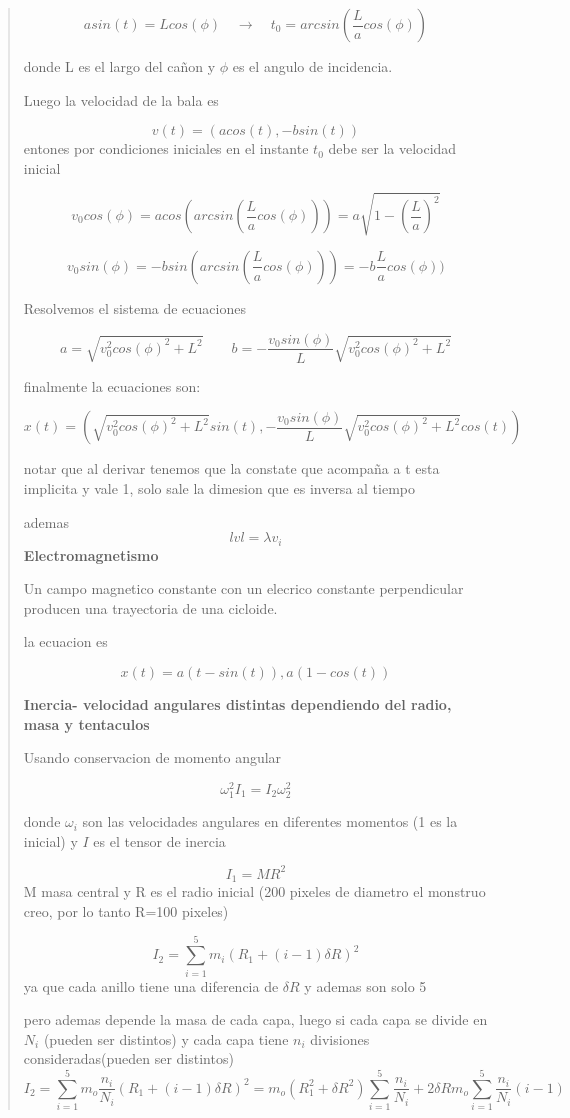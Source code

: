 \documentclass[a4paper, 10pt]{article}
\begin{document}
\begin{quote}
$$ asin(t)= Lcos(\phi) \quad \rightarrow \quad t_0= arcsin( \frac{L}{a}cos(\phi)) $$

donde L es el largo del cañon y $\phi$ es el angulo de incidencia.
 
Luego la velocidad de la bala es

$$ v(t)= (acos(t),-bsin(t)) $$
entones por condiciones iniciales en  el instante $t_0$ debe ser la velocidad inicial

$$  v_0 cos(\phi)= acos( arcsin( \frac{L}{a}cos(\phi)))= a \sqrt{1-  (\frac{L}{a})^2} $$

$$ v_0 sin(\phi) = -bsin( arcsin( \frac{L}{a}cos(\phi)))=-b \frac{L}{a}cos(\phi)) $$

Resolvemos el sistema de ecuaciones

$$ a= \sqrt{v_0^2 cos(\phi)^2 +L^2} \qquad b=- \frac{v_0 sin(\phi)}{L}\sqrt{v_0^2cos(\phi)^2 +L^2} $$

finalmente la ecuaciones son:

$$x(t)= ( \sqrt{v_0^2 cos(\phi)^2 +L^2} sin(t), - \frac{v_0 sin(\phi)}{L}\sqrt{v_0^2cos(\phi)^2 +L^2}cos(t))$$

notar que al derivar tenemos que la constate que acompaña a t esta implicita y vale 1, solo sale la dimesion que es inversa al tiempo

ademas $$ lvl = \lambda v_i $$
\textbf{Electromagnetismo}

Un campo magnetico constante con un elecrico constante perpendicular producen una trayectoria de una cicloide.


la ecuacion es

$$x(t) = a(t-sin(t)), a(1-cos(t)) $$


\textbf{Inercia- velocidad angulares distintas dependiendo del radio, masa y tentaculos}

Usando conservacion de momento angular

$$\omega_1^2 I_1 = I_2 \omega_2^2 $$

donde $\omega_i$ son las velocidades angulares en diferentes momentos (1 es la inicial) y $I$ es el tensor de inercia


$$I_1= MR^2$$
M masa central y R es el radio inicial (200 pixeles de diametro el monstruo  creo, por lo tanto R=100 pixeles)

$$I_2 = \sum_{i=1}^5 m_i (R_1 + (i-1)\delta R)^2 $$ 
ya que cada anillo tiene una diferencia de $\delta R$ y ademas son solo 5

pero ademas depende la masa de cada capa, luego si cada capa se divide en $N_i$ (pueden ser distintos) y cada capa tiene $n_i$ divisiones consideradas(pueden ser distintos)
$$I_2= \sum_{i=1}^5  m_o \frac{n_i}{N_i}( R_1 + (i-1)\delta R )^2 = m_o(R_1^2 +\delta R^2)\sum_{i=1}^5\frac{n_i}{ N_i} + 2 \delta Rm_o \sum_{i=1}^5 \frac{n_i}{N_i}(i-1)  $$


\end{quote}
\end{document}
